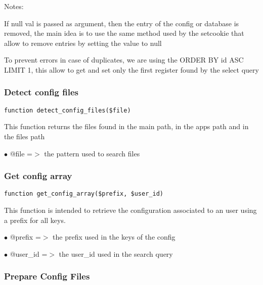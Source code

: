 \documentclass[a4paper]{article}
\begin{document}
Notes:

If null val is passed as argument, then the entry of the config or database
is removed, the main idea is to use the same method used by the setcookie
that allow to remove entries by setting the value to null

To prevent errors in case of duplicates, we are using the ORDER BY id ASC
LIMIT 1, this allow to get and set only the first register found by the
select query

\hypertarget{toc80}{}
\subsubsection{Detect config files}

\begin{lstlisting}
function detect_config_files($file)
\end{lstlisting}

This function returns the files found in the main path, in the apps path and in the files path

\begin{compactitem}
\item[\color{myblue}$\bullet$] @file =$>$ the pattern used to search files
\end{compactitem}

\hypertarget{toc81}{}
\subsubsection{Get config array}

\begin{lstlisting}
function get_config_array($prefix, $user_id)
\end{lstlisting}

This function is intended to retrieve the configuration associated to an user
using a prefix for all keys.

\begin{compactitem}
\item[\color{myblue}$\bullet$] @prefix  =$>$ the prefix used in the keys of the config
\item[\color{myblue}$\bullet$] @user\_id =$>$ the user\_id used in the search query
\end{compactitem}

\hypertarget{toc82}{}
\subsubsection{Prepare Config Files}
\end{document}
